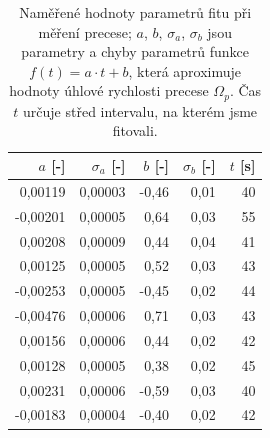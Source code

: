 \documentclass[english]{article}
\begin{document}
\begin{table}[h]
{          \begin{tabular}{|r|r|r|r|r|}
          \hline
          $a$ [-] & $\sigma_a$ [-] & $b$ [-] & $\sigma_b$ [-] & $t$ [s] \bigstrut\\
          \hline
          0,00119 & 0,00003 & -0,46 & 0,01  & 40 \bigstrut\\
          \hline
          -0,00201 & 0,00005 & 0,64  & 0,03  & 55 \bigstrut\\
          \hline
          0,00208 & 0,00009 & 0,44  & 0,04  & 41 \bigstrut\\
          \hline
          0,00125 & 0,00005 & 0,52  & 0,03  & 43 \bigstrut\\
          \hline
          -0,00253 & 0,00005 & -0,45 & 0,02  & 44 \bigstrut\\
          \hline
          -0,00476 & 0,00006 & 0,71  & 0,03  & 43 \bigstrut\\
          \hline
          0,00156 & 0,00006 & 0,44  & 0,02  & 42 \bigstrut\\
          \hline
          0,00128 & 0,00005 & 0,38  & 0,02  & 45 \bigstrut\\
          \hline
          0,00231 & 0,00006 & -0,59 & 0,03  & 40 \bigstrut\\
          \hline
          -0,00183 & 0,00004 & -0,40 & 0,02  & 42 \bigstrut\\
          \hline
          \end{tabular}%
      
  

      
   
  \caption{Naměřené hodnoty parametrů fitu při měření precese; $a$, $b$, $\sigma_a$, $\sigma_b$ jsou parametry a chyby parametrů funkce $f(t) = a\cdot t + b$, která aproximuje hodnoty úhlové rychlosti precese $\Omega_p$. Čas $t$ určuje střed intervalu, na kterém jsme fitovali.}
    \label{tab:gyro_precese_fit}%

}

\end{table}
\end{document}
